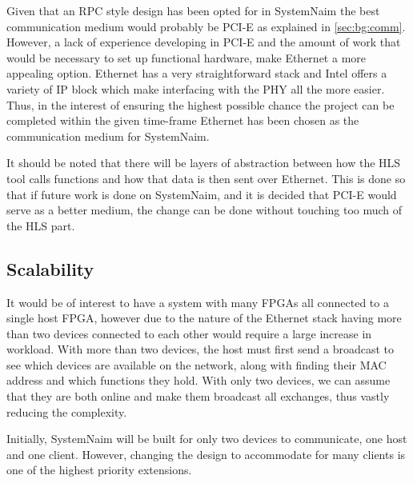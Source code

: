 Given that an RPC style design has been opted for in SystemNaim the best communication medium would probably be PCI-E as explained in \autoref{sec:bg:comm}. However, a lack of experience developing in PCI-E and the amount of work that would be necessary to set up functional hardware, make Ethernet a more appealing option. Ethernet has a very straightforward stack and Intel offers a variety of IP block which make interfacing with the PHY all the more easier. Thus, in the interest of ensuring the highest possible chance the project can be completed within the given time-frame Ethernet has been chosen as the communication medium for SystemNaim.

It should be noted that there will be layers of abstraction between how the HLS tool calls functions and how that data is then sent over Ethernet. This is done so that if future work is done on SystemNaim, and it is decided that PCI-E would serve as a better medium, the change can be done without touching too much of the HLS part.

\subsection{Scalability}

It would be of interest to have a system with many FPGAs all connected to a single host FPGA, however due to the nature of the Ethernet stack having more than two devices connected to each other would require a large increase in workload. With more than two devices, the host must first send a broadcast to see which devices are available on the network, along with finding their MAC address and which functions they hold. With only two devices, we can assume that they are both online and make them broadcast all exchanges, thus vastly reducing the complexity. 

Initially, SystemNaim will be built for only two devices to communicate, one host and one client. However, changing the design to accommodate for many clients is one of the highest priority extensions.


